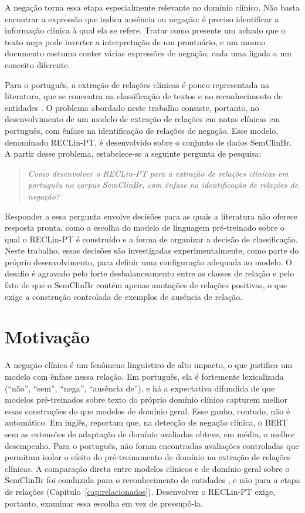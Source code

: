 A negação torna essa etapa especialmente relevante no domínio clínico. Não basta
encontrar a expressão que indica ausência ou negação: é preciso identificar a
informação clínica à qual ela se refere. Tratar como presente um achado que o texto
nega pode inverter a interpretação de um prontuário, e um mesmo documento costuma
conter várias expressões de negação, cada uma ligada a um conceito diferente.

Para o português, a extração de relações clínicas é pouco representada na
literatura, que se concentra na classificação de textos e no reconhecimento de
entidades \cite{shimaoka_2026_revisao}. O problema abordado neste trabalho consiste, portanto, no desenvolvimento de um modelo de extração de relações em notas clínicas em português, com ênfase na identificação de relações de negação. Esse modelo, denominado RECLin-PT, é desenvolvido sobre o conjunto de dados SemClinBr. A partir desse problema, estabelece-se a seguinte pergunta de pesquisa:

\begin{quote}
\emph{Como desenvolver o RECLin-PT para a extração de relações clínicas em português
no corpus SemClinBr, com ênfase na identificação de relações de negação?}
\end{quote}

Responder a essa pergunta envolve decisões para as quais a literatura não oferece
resposta pronta, como a escolha do modelo de linguagem pré-treinado sobre o qual o
RECLin-PT é construído e a forma de organizar a decisão de classificação. Neste
trabalho, essas decisões são investigadas experimentalmente, como parte do próprio
desenvolvimento, para definir uma configuração adequada ao modelo. O desafio é agravado pelo forte desbalanceamento entre as classes de relação e pelo fato de que o SemClinBr contém apenas anotações de relações positivas, o que exige a construção controlada de exemplos de ausência de relação.

\section{Motivação}
\label{sec:motivacao}

A negação clínica é um fenômeno linguístico de alto impacto, o que justifica um
modelo com ênfase nessa relação. Em português, ela é fortemente lexicalizada (``não'',
``sem'', ``nega'', ``ausência de''), e há a expectativa difundida de que modelos
pré-treinados sobre texto do próprio domínio clínico capturem melhor essas
construções do que modelos de domínio geral. Esse ganho, contudo, não é automático. Em
inglês,  reportam que, na detecção de negação clínica, o
BERT sem as extensões de adaptação de domínio avaliadas obteve, em média, o melhor
desempenho. Para o português, não foram encontradas avaliações controladas que permitam isolar o efeito do pré-treinamento de domínio na extração de relações clínicas. A comparação direta
entre modelos clínicos e de domínio geral sobre o SemClinBr foi conduzida para o
reconhecimento de entidades \cite{almeida_2026_benchmarkner}, e não para a etapa de
relações (Capítulo~\ref{cap:relacionados}). Desenvolver o RECLin-PT exige, portanto,
examinar essa escolha em vez de pressupô-la.

